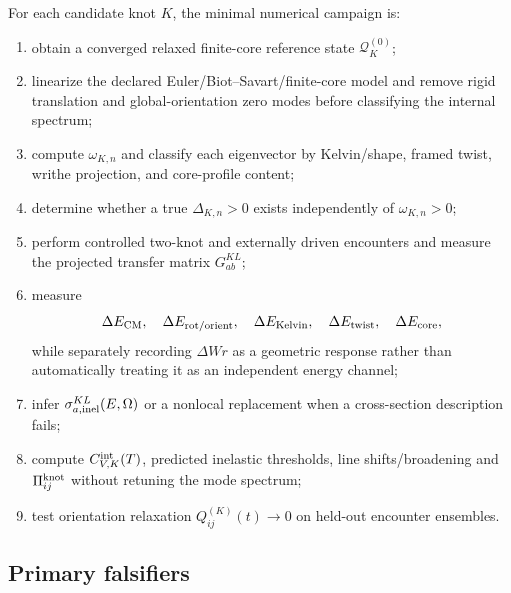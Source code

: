 For each candidate knot $K$, the minimal numerical campaign is:
\begin{enumerate}
    \item obtain a converged relaxed finite-core reference state
    $\mathcal Q_K^{(0)}$;
    \item linearize the declared Euler/Biot--Savart/finite-core model and remove
    rigid translation and global-orientation zero modes before classifying the
    internal spectrum;
    \item compute $\omega_{K,n}$ and classify each eigenvector by Kelvin/shape,
    framed twist, writhe projection, and core-profile content;
    \item determine whether a true $\Delta_{K,n}>0$ exists independently of
    $\omega_{K,n}>0$;
    \item perform controlled two-knot and externally driven encounters and
    measure the projected transfer matrix $G^{KL}_{ab}$;
    \item measure
    \begin{equation}
        \Delta E_{\rm CM},\quad
        \Delta E_{\rm rot/orient},\quad
        \Delta E_{\rm Kelvin},\quad
        \Delta E_{\rm twist},\quad
        \Delta E_{\rm core},
        \label{eq:rt_maxwell_energy_transfer_channels}
    \end{equation}
    while separately recording $\Delta Wr$ as a geometric response rather than
    automatically treating it as an independent energy channel;
    \item infer $\sigma^{KL}_{a,\rm inel}(E,\Omega)$ or a nonlocal replacement
    when a cross-section description fails;
    \item compute $C_{V,K}^{\rm int}(T)$, predicted inelastic thresholds,
    line shifts/broadening and $\Pi_{ij}^{\rm knot}$ without retuning the mode
    spectrum;
    \item test orientation relaxation
    $Q_{ij}^{(K)}(t)\to0$ on held-out encounter ensembles.
\end{enumerate}

\subsection{Primary falsifiers}

